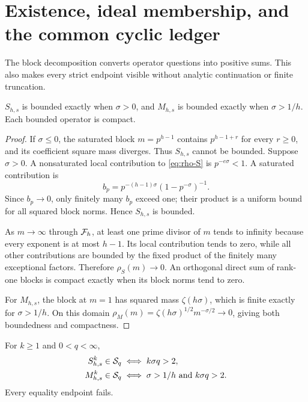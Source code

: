\section{Existence, ideal membership, and the common cyclic ledger}
\label{sec:ledger}

The block decomposition converts operator questions into positive sums.
This also makes every strict endpoint visible without analytic
continuation or finite truncation.

\begin{proposition}
\label{prop:existence}
$S_{h,s}$ is bounded exactly when $\sigma>0$, and $M_{h,s}$ is bounded
exactly when $\sigma>1/h$.  Each bounded operator is compact.
\end{proposition}

\begin{proof}
If $\sigma\le0$, the saturated block $m=p^{h-1}$ contains
$p^{h-1+r}$ for every $r\ge0$, and its coefficient square mass diverges.
Thus $S_{h,s}$ cannot be bounded.  Suppose $\sigma>0$.  A nonsaturated
local contribution to \cref{eq:rho-S} is $p^{-e\sigma}<1$.  A saturated
contribution is
\[
  b_p=p^{-(h-1)\sigma}(1-p^{-\sigma})^{-1}.
\]
Since $b_p\to0$, only finitely many $b_p$ exceed one; their product is a
uniform bound for all squared block norms.  Hence $S_{h,s}$ is bounded.

As $m\to\infty$ through $\mathcal F_h$, at least one prime divisor of $m$ tends to
infinity because every exponent is at most $h-1$.  Its local contribution
tends to zero, while all other contributions are bounded by the fixed
product of the finitely many exceptional factors.  Therefore
$\rho_S(m)\to0$.  An orthogonal direct sum of rank-one blocks is compact
exactly when its block norms tend to zero.

For $M_{h,s}$, the block at $m=1$ has squared mass $\zeta(h\sigma)$,
which is finite exactly for $\sigma>1/h$.  On this domain
$\rho_M(m)=\zeta(h\sigma)^{1/2}m^{-\sigma/2}\to0$, giving both boundedness
and compactness.
\end{proof}

\begin{proposition}
\label{prop:schatten}
For $k\ge1$ and $0<q<\infty$,
\begin{align*}
  S_{h,s}^{k}\in\mathcal S_q&\iff k\sigma q>2,\\
  M_{h,s}^{k}\in\mathcal S_q&\iff \sigma>1/h\ \text{and}\ k\sigma q>2.
\end{align*}
Every equality endpoint fails.
\end{proposition}

